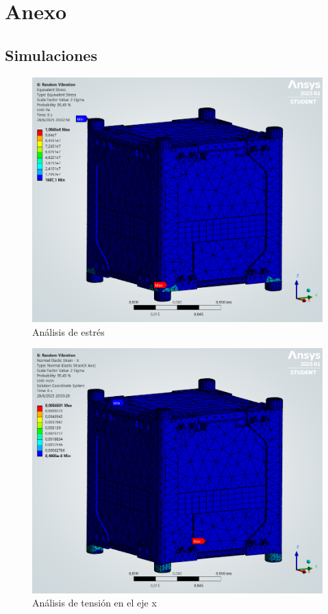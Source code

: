 \pagestyle{empty}
\chapter{Anexo}

\section{Simulaciones}

  \begin{figure}[H]
    \centering
    \includegraphics[width=15cm]{image/fem/ansys_cubesat-vibration_stress.png}
    \caption{Análisis de estrés}
  \end{figure}

  \begin{figure}[H]
    \centering
    \includegraphics[width=14cm]{image/fem/ansys_cubesat-vibration_strain-x.png}
    \caption{Análisis de tensión en el eje x}
  \end{figure}

